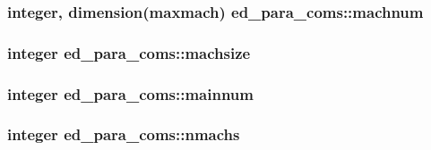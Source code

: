 \subsubsection[{machnum}]{\setlength{\rightskip}{0pt plus 5cm}integer, dimension(maxmach) ed\+\_\+para\+\_\+coms\+::machnum}\label{namespaceed__para__coms_a38ed61f526634d9930f8f93a6a65cba4}
\hypertarget{namespaceed__para__coms_ac54b6ab59f73c004e11f26ed942382c6}{}
\subsubsection[{machsize}]{\setlength{\rightskip}{0pt plus 5cm}integer ed\+\_\+para\+\_\+coms\+::machsize}\label{namespaceed__para__coms_ac54b6ab59f73c004e11f26ed942382c6}
\hypertarget{namespaceed__para__coms_a1a6297adee3ed24d243e8acdc8a47ea9}{}
\subsubsection[{mainnum}]{\setlength{\rightskip}{0pt plus 5cm}integer ed\+\_\+para\+\_\+coms\+::mainnum}\label{namespaceed__para__coms_a1a6297adee3ed24d243e8acdc8a47ea9}
\hypertarget{namespaceed__para__coms_a19b6021232603bcc102754344756972d}{}
\subsubsection[{nmachs}]{\setlength{\rightskip}{0pt plus 5cm}integer ed\+\_\+para\+\_\+coms\+::nmachs}\label{namespaceed__para__coms_a19b6021232603bcc102754344756972d}
